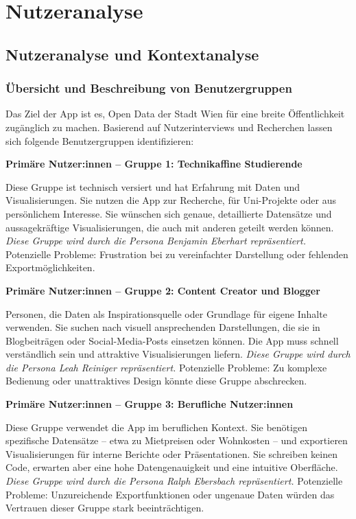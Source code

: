 \section{Nutzeranalyse}

\subsection{Nutzeranalyse und Kontextanalyse}

\subsubsection{Übersicht und Beschreibung von Benutzergruppen}

\smallskip
\noindent
Das Ziel der App ist es, Open Data der Stadt Wien für eine breite Öffentlichkeit zugänglich zu machen.
Basierend auf Nutzerinterviews und Recherchen lassen sich folgende Benutzergruppen identifizieren:

\medskip
\noindent\textbf{Primäre Nutzer:innen -- Gruppe 1: Technikaffine Studierende}

\smallskip
\noindent
Diese Gruppe ist technisch versiert und hat Erfahrung mit Daten und Visualisierungen.
Sie nutzen die App zur Recherche, für Uni-Projekte oder aus persönlichem Interesse.
Sie wünschen sich genaue, detaillierte Datensätze und aussagekräftige Visualisierungen, die auch mit anderen geteilt werden können.
\textit{Diese Gruppe wird durch die Persona Benjamin Eberhart repräsentiert.}
Potenzielle Probleme: Frustration bei zu vereinfachter Darstellung oder fehlenden Exportmöglichkeiten.

\medskip
\noindent\textbf{Primäre Nutzer:innen -- Gruppe 2: Content Creator und Blogger}

\smallskip
\noindent
Personen, die Daten als Inspirationsquelle oder Grundlage für eigene Inhalte verwenden.
Sie suchen nach visuell ansprechenden Darstellungen, die sie in Blogbeiträgen oder Social-Media-Posts einsetzen können.
Die App muss schnell verständlich sein und attraktive Visualisierungen liefern.
\textit{Diese Gruppe wird durch die Persona Leah Reiniger repräsentiert.}
Potenzielle Probleme: Zu komplexe Bedienung oder unattraktives Design könnte diese Gruppe abschrecken.

\medskip
\noindent\textbf{Primäre Nutzer:innen -- Gruppe 3: Berufliche Nutzer:innen}

\smallskip
\noindent
Diese Gruppe verwendet die App im beruflichen Kontext.
Sie benötigen spezifische Datensätze -- etwa zu Mietpreisen oder Wohnkosten -- und exportieren Visualisierungen für interne Berichte oder Präsentationen.
Sie schreiben keinen Code, erwarten aber eine hohe Datengenauigkeit und eine intuitive Oberfläche.
\textit{Diese Gruppe wird durch die Persona Ralph Ebersbach repräsentiert.}
Potenzielle Probleme: Unzureichende Exportfunktionen oder ungenaue Daten würden das Vertrauen dieser Gruppe stark beeinträchtigen.

